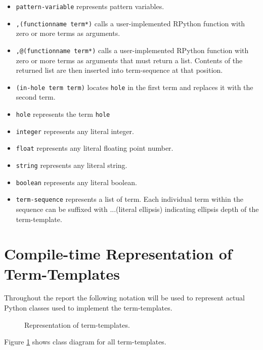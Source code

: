 \begin{itemize}
\item
\texttt{pattern-variable} represents pattern variables.
\item
\texttt{,(functionname term*)} calls a user-implemented RPython function with zero or more terms as arguments.
\item
\texttt{,@(functionname term*)} calls a user-implemented RPython function with zero or more terms as arguments that must return a list. Contents of the returned list are then inserted into term-sequence at that position.
\item
\texttt{(in-hole term term)} locates \lstinline{hole} in the first term and replaces it with the second term.
\item
\texttt{hole} represents the term \lstinline{hole}
\item
\texttt{integer} represents any literal integer.
\item
\texttt{float} represents any literal floating point number.
\item
\texttt{string}  represents any literal string.
\item
\texttt{boolean}  represents any literal boolean.
\item
\texttt{term-sequence} represents a list of term.  Each individual term within the sequence can be suffixed with ...(literal ellipsis) indicating ellipsis depth of the term-template.
\end{itemize}

\section{Compile-time Representation of Term-Templates}

Throughout the report the following notation will be used to represent actual Python classes used to implement the term-templates.

\begin{figure}[H]
	\centering
	\caption{Representation of term-templates.}
\label{class-diagram-termtemplate}
\end{figure}

Figure \ref{class-diagram-termtemplate} shows class diagram for all term-templates.


